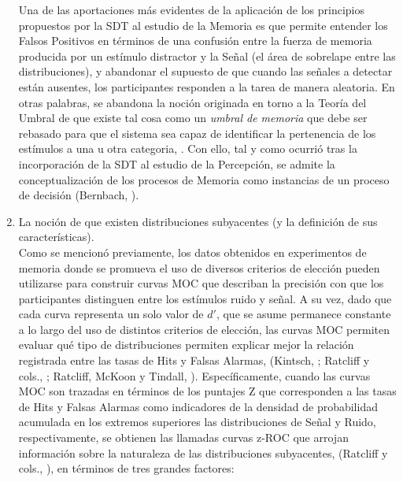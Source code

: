 \begin{enumerate}
Una de las aportaciones más evidentes de la aplicación de los principios propuestos por la SDT al estudio de la Memoria es que permite entender los Falsos Positivos en términos de una confusión entre la fuerza de memoria producida por un estímulo distractor y la Señal (el área de sobrelape entre las distribuciones), y abandonar el supuesto de que cuando las señales a detectar están ausentes, los participantes responden a la tarea de manera aleatoria. En otras palabras, se abandona la noción originada en torno a la Teoría del Umbral de que existe tal cosa como un \textit{umbral de memoria} que debe ser rebasado para que el sistema sea capaz de identificar la pertenencia de los estímulos a una u otra categoria, \citep{Murdock1982, Gillund1984, Yonelinas1996, Wixted2007}. Con ello, tal y como ocurrió tras la incorporación de la SDT al estudio de la Percepción, se admite la conceptualización de los procesos de Memoria como instancias de un proceso de decisión (Bernbach, \citeyear{Bernbach1967}).\\
 
\item La noción de que existen distribuciones subyacentes (y la definición de sus características).\\

Como se mencionó previamente, los datos obtenidos en experimentos de memoria donde se promueva el uso de diversos criterios de elección pueden utilizarse para construir curvas MOC que describan la precisión con que los participantes distinguen entre los estímulos ruido y señal. A su vez, dado que cada curva representa un solo valor de $d'$, que se asume permanece constante a lo largo del uso de distintos criterios de elección, las curvas MOC permiten evaluar qué tipo de distribuciones permiten explicar mejor la relación registrada entre las tasas de Hits y Falsas Alarmas, (Kintsch, \citeyear{Kintsch1967}; Ratcliff y cols., \citeyear{Ratcliff1992}; Ratcliff, McKoon y Tindall, \citeyear{Ratcliff1994}). Específicamente, cuando las curvas MOC son trazadas en términos de los puntajes Z que corresponden a las tasas de Hits y Falsas Alarmas como indicadores de la densidad de probabilidad acumulada en los extremos superiores las distribuciones de Señal y Ruido, respectivamente, se obtienen las llamadas curvas z-ROC que arrojan información sobre la naturaleza de las distribuciones subyacentes, (Ratcliff y cols., \citeyear{Ratcliff1992}), en términos de tres grandes factores:\\


\end{enumerate}
